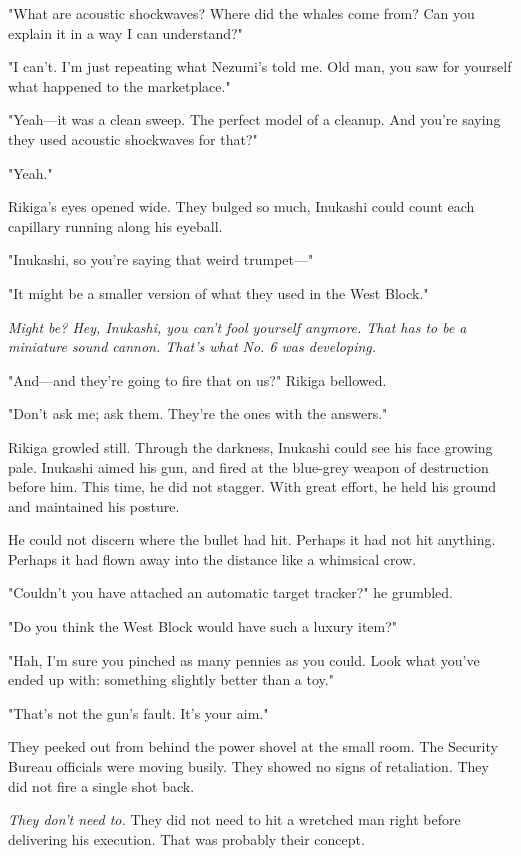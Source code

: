 "What are acoustic shockwaves? Where did the whales come from? Can you
explain it in a way I can understand?"

"I can't. I'm just repeating what Nezumi's told me. Old man, you saw for
yourself what happened to the marketplace."

"Yeah---it was a clean sweep. The perfect model of a cleanup. And you're
saying they used acoustic shockwaves for that?"

"Yeah."

Rikiga's eyes opened wide. They bulged so much, Inukashi could count
each capillary running along his eyeball.

"Inukashi, so you're saying that weird trumpet---"

"It might be a smaller version of what they used in the West Block."

\emph{Might be? Hey, Inukashi, you can't fool yourself anymore. That has to be
a miniature sound cannon. That's what No. 6 was developing.}

"And---and they're going to fire that on us?" Rikiga bellowed.

"Don't ask me; ask them. They're the ones with the answers."

Rikiga growled still. Through the darkness, Inukashi could see his face
growing pale. Inukashi aimed his gun, and fired at the blue-grey weapon
of destruction before him. This time, he did not stagger. With great
effort, he held his ground and maintained his posture.

He could not discern where the bullet had hit. Perhaps it had not hit
anything. Perhaps it had flown away into the distance like a whimsical
crow.

"Couldn't you have attached an automatic target tracker?" he grumbled.

"Do you think the West Block would have such a luxury item?"

"Hah, I'm sure you pinched as many pennies as you could. Look what
you've ended up with: something slightly better than a toy."

"That's not the gun's fault. It's your aim."

They peeked out from behind the power shovel at the small room. The
Security Bureau officials were moving busily. They showed no signs of
retaliation. They did not fire a single shot back.

\emph{They don't need to.} They did not need to hit a wretched man right before
delivering his execution. That was probably their concept.

